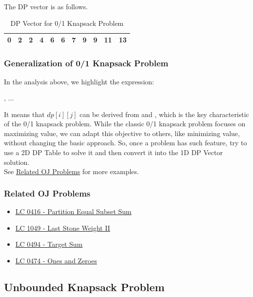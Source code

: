 The DP vector is as follows.
\begin{table}[H]
\centering
\begin{tabular}{|c|c|c|c|c|c|c|c|c|c|c|}
\hline
0 & 2 & 2 & 4 & 6 & 6 & 7 & 9 & 9 & 11 & 13 \\
\hline
\end{tabular}
\caption{DP Vector for 0/1 Knapsack Problem}
\end{table}

\subsubsection{Generalization of 0/1 Knapsack Problem}
In the analysis above, we highlight the expression:
\begin{center}
{\color{ForestGreen}{For each item $i$, we can choose to either put it into the knapsack or not}}, ...
\end{center}
It means that $dp[i][j]$ can be derived from {\color{blue}{$dp[i-1][j]$ (doesn't put item $i$ into the knapsack)}} and {\color{blue}{$dp[i][j-w_{i-1}]$ (put the item $i$ into the knapsack)}}, which is the key characteristic of the 0/1 knapsack problem. While the classic 0/1 knapsack problem focuses on maximizing value, we can adapt this objective to others, like minimizing value, without changing the basic approach.  So, once a problem has such feature, try to use a 2D DP Table to solve it and then convert it into the 1D DP Vector solution. \\

See \hyperref[subsubsec:01_knapsack_oj_problems]{Related OJ Problems} for more examples.

\subsubsection{Related OJ Problems}\label{subsubsec:01_knapsack_oj_problems}
\begin{itemize}
\item \hyperref[lc0416]{LC 0416 - Partition Equal Subset Sum}
\item \hyperref[lc1049]{LC 1049 - Last Stone Weight II}
\item \hyperref[lc0494]{LC 0494 - Target Sum}
\item \hyperref[lc0474]{LC 0474 - Ones and Zeroes}
\end{itemize}

\subsection{Unbounded Knapsack Problem}
